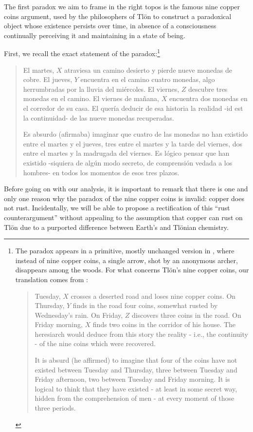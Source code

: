 The first paradox we aim to frame in the right topos is the famous nine copper coins argument, used by the philosophers of Tlön to construct a paradoxical object whose existence persists over time, in absence of a consciousness continually perceiving it and maintaining in a state of being.
\begin{example}\label{bla}
	First, we recall the exact statement of the paradox:\footnote{The paradox appears in a primitive, mostly unchanged version in \cite{borges1997otras}, where instead of nine copper coins, a single arrow, shot by an anonymous archer, disappears among the woods. For what concerns Tl\"on's  nine copper coins, our translation comes from \cite{tlonEN}:
		\begin{quote}
			\hspace{.5em} Tuesday, $X$ crosses a deserted road and loses nine copper coins. On Thursday, $Y$ finds in the road four coins, somewhat rusted by Wednesday's rain. On Friday, $Z$ discovers three coins in the road. On Friday morning, $X$ finds two coins in the corridor of his house. The heresiarch would deduce from this story the reality - i.e., the continuity - of the nine coins which were recovered.

			\hspace{.5em} It is absurd (he affirmed) to imagine that four of the coins have not existed between Tuesday and Thursday, three between Tuesday and Friday afternoon, two between Tuesday and Friday morning. It is logical to think that they have existed - at least in some secret way, hidden from the comprehension of men - at every moment of those three periods.
		\end{quote}}
	\begin{quote}
		El martes, $X$ atraviesa un camino desierto y pierde nueve monedas de cobre.
		El jueves, $Y$ encuentra en el camino cuatro monedas, algo herrumbradas por la lluvia del miércoles. El viernes, $Z$ descubre tres monedas en el camino. El viernes de mañana, $X$ encuentra dos monedas en el corredor de su casa. El  quería deducir de esa historia la realidad -id est la continuidad- de las nueve monedas recuperadas.

		Es absurdo (afirmaba) imaginar que cuatro de las monedas no han existido entre el martes y el jueves, tres entre el martes y la tarde del viernes, dos entre el martes y la madrugada del viernes. Es lógico pensar que han existido -siquiera de algún modo secreto, de comprensión vedada a los hombres- en todos los momentos de esos tres plazos.
	\end{quote}
	Before going on with our analysis, it is important to remark that there is one and only one reason why the paradox of the nine copper coins is invalid: copper does not rust. Incidentally, we will be able to propose a rectification of this ``rust counterargument'' without appealing to the assumption that copper can rust on Tl\"on due to a purported difference between Earth's and Tl\"onian chemistry.


\end{example}
